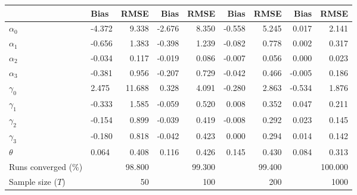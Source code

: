 
\begin{tabular}[t]{llrrrrrrr}
\toprule
  & Bias & RMSE & Bias & RMSE & Bias & RMSE & Bias & RMSE\\
\midrule
$\alpha_{0}$ & -4.372 & 9.338 & -2.676 & 8.350 & -0.558 & 5.245 & 0.017 & 2.141\\
$\alpha_{1}$ & -0.656 & 1.383 & -0.398 & 1.239 & -0.082 & 0.778 & 0.002 & 0.317\\
$\alpha_{2}$ & -0.034 & 0.117 & -0.019 & 0.086 & -0.007 & 0.056 & 0.000 & 0.023\\
$\alpha_{3}$ & -0.381 & 0.956 & -0.207 & 0.729 & -0.042 & 0.466 & -0.005 & 0.186\\
$\gamma_{0}$ & 2.475 & 11.688 & 0.328 & 4.091 & -0.280 & 2.863 & -0.534 & 1.876\\
$\gamma_{1}$ & -0.333 & 1.585 & -0.059 & 0.520 & 0.008 & 0.352 & 0.047 & 0.211\\
$\gamma_{2}$ & -0.154 & 0.899 & -0.039 & 0.419 & -0.008 & 0.292 & 0.023 & 0.145\\
$\gamma_{3}$ & -0.180 & 0.818 & -0.042 & 0.423 & 0.000 & 0.294 & 0.014 & 0.142\\
$\theta$ & 0.064 & 0.408 & 0.116 & 0.426 & 0.145 & 0.430 & 0.084 & 0.313\\
Runs converged (\%) &  & 98.800 &  & 99.300 &  & 99.400 &  & 100.000\\
Sample size ($T$) &  & 50 &  & 100 &  & 200 &  & 1000\\
\bottomrule
\end{tabular}
